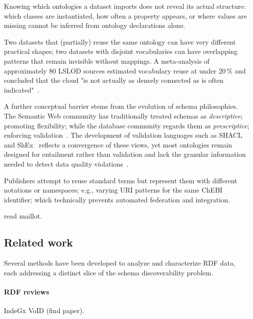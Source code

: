 \documentclass[12pt]{article}
\begin{document}
Knowing which ontologies a dataset imports does not reveal its actual
structure: which classes are instantiated, how often a property appears,
or where values are missing cannot be inferred from ontology declarations
alone.

Two datasets that (partially) reuse the same ontology can have very different practical
shapes; two datasets with disjoint vocabularies can have overlapping
patterns that remain invisible without mappings.
A meta-analysis of approximately 80 LSLOD sources estimated vocabulary
reuse at under 20\,\% and concluded that the cloud "is not actually as
densely connected as is often
indicated"~\cite{kamdar_empirical_2021}.

A further conceptual barrier stems from the evolution of schema
philosophies.
The Semantic Web community has traditionally treated schemas as
\emph{descriptive}; promoting flexibility; while the database community
regards them as \emph{prescriptive}; enforcing
validation~\cite{ahmetaj}.
The development of validation languages such as SHACL and
ShEx~\cite{ahmetaj,mihindukulasooriya_rdf_2018} reflects a convergence of these
views, yet most ontologies remain designed for entailment rather than
validation and lack the granular information needed to detect data
quality violations~\cite{mihindukulasooriya_rdf_2018}.

Publishers attempt to reuse standard terms but represent them with
different notations or namespaces; e.g., varying URI patterns for the
same ChEBI identifier; which technically prevents automated federation
and integration\cite{hoyt_unifying_2022, its sources too}.

\cite{maillot_eat_2025} read maillot.

\subsection{Related work}

Several methods have been developed to analyze and characterize RDF data,
each addressing a distinct slice of the schema discoverability problem.
\paragraph*{RDF reviews}
IndeGx \cite{maillot_indegx_2023}
VoID (find paper).
\end{document}

